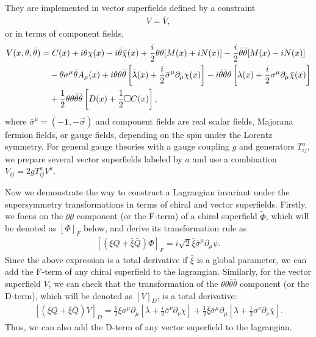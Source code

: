 \documentclass[12pt,twoside,book]{article}
\begin{document}
They are implemented in vector superfields defined by a constraint
\begin{align}
  V = \bar{V},
\end{align}
or in terms of component fields,
\begin{align}
  V(x,\theta,\bar{\theta}) &= C(x) + i\theta\chi(x) -
  i\bar{\theta}\bar{\chi}(x) + \frac{i}{2}\theta\theta [M(x) + iN(x)] -
  \frac{i}{2} \bar{\theta}\bar{\theta} [M(x) - iN(x)] \notag \\
  &\quad - \theta \sigma^\mu \bar{\theta} A_\mu(x) +
  i\theta\theta\bar{\theta} \left[ \bar{\lambda}(x) +
  \frac{i}{2}\bar{\sigma}^\mu \partial_\mu \chi(x) \right] -
  i\bar{\theta}\bar{\theta}\theta \left[ \lambda(x) + \frac{i}{2}
  \sigma^\mu \partial_\mu \bar{\chi}(x) \right] \notag \\
  &\quad + \frac{1}{2} \theta\theta\bar{\theta}\bar{\theta}\left[ D(x) +
  \frac{1}{2}\Box C(x)\right], \label{vectorsuperf}
\end{align}
where $\bar{\sigma}^\mu = (-\textbf{1},-\vec{\sigma})$ and component
fields are real scalar fields, Majorana fermion fields, or gauge
fields, depending on the spin under the Lorentz symmetry.  For general
gauge theories with a gauge coupling $g$ and generators $T^a_{i j}$, we
prepare several vector superfields labeled by $a$ and use a
combination $V_{i j} = 2gT^a_{i j} V^a$.

Now we demonstrate the way to construct a Lagrangian invariant under the supersymmetry transformations in terms of chiral and vector superfields.
Firstly, we focus on the $\theta\theta$ component (or the F-term) of a chiral superfield $\tilde{\Phi}$, which will be denoted as $[\Phi]_F$ below, and derive its transformation rule as
\begin{align}
  \left[ (\xi Q + \bar{\xi} \bar{Q}) \Phi \right]_F
  = i\sqrt{2} \bar{\xi} \bar{\sigma}^\mu \partial_\mu \psi.
\end{align}
Since the above expression is a total derivative if $\bar{\xi}$ is a global parameter, we can add the F-term of any chiral superfield to the lagrangian.
Similarly, for the vector superfield $V$, we can check that the transformation of the $\theta\theta\bar{\theta}\bar{\theta}$ component (or the D-term), which will be denoted as $[V]_D$, is a total derivative:
\begin{align}
  \left[ (\xi Q + \bar{\xi} \bar{Q}) V \right]_D = \frac{1}{2} \xi
  \sigma^\mu \partial_\mu \left[ \bar{\lambda} + \frac{i}{2}
  \bar{\sigma}^\nu \partial_\nu \chi \right] + \frac{1}{2} \bar{\xi}
  \bar{\sigma}^\mu \partial_\mu \left[ \lambda + \frac{i}{2} \sigma^\nu
  \partial_\nu \bar{\chi}\right].
\end{align}
Thus, we can also add the D-term of any vector superfield to the lagrangian.
\end{document}
